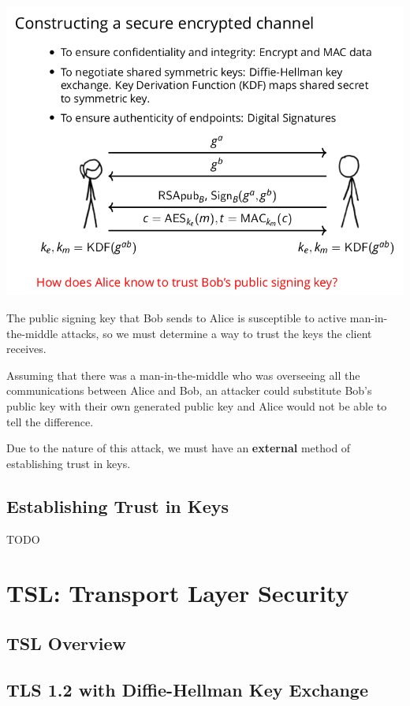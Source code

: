\documentclass[11pt]{article} %
\begin{document}
{\includegraphics[scale=.7]{./tls4.png}

The public signing key that Bob sends to Alice is susceptible to
active man-in-the-middle attacks, so we must determine a way to trust the keys 
the client receives.

\bigskip
Assuming that there was a man-in-the-middle who was overseeing all the
communications between Alice and Bob, an attacker could substitute Bob's public
key with their own generated public key and Alice would not be able to tell 
the difference.

\bigskip
Due to the nature of this attack, we must have an \textbf{external} method of
establishing trust in keys.

\newpage
\subsection{Establishing Trust in Keys}
TODO

\section{TSL: Transport Layer Security}

\subsection{TSL Overview}

\subsection{TLS 1.2 with Diffie-Hellman Key Exchange}

}
\end{document}
